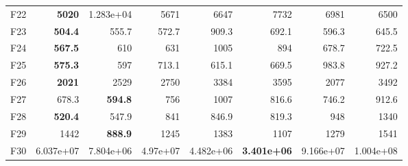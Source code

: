 \begin{tabular}{lrrrrrrr}
F22 & \textbf{5020} & 1.283e+04 & 5671 & 6647 & 7732 & 6981 & 6500 \\
F23 & \textbf{504.4} & 555.7 & 572.7 & 909.3 & 692.1 & 596.3 & 645.5 \\
F24 & \textbf{567.5} & 610 & 631 & 1005 & 894 & 678.7 & 722.5 \\
F25 & \textbf{575.3} & 597 & 713.1 & 615.1 & 669.5 & 983.8 & 927.2 \\
F26 & \textbf{2021} & 2529 & 2750 & 3384 & 3595 & 2077 & 3492 \\
F27 & 678.3 & \textbf{594.8} & 756 & 1007 & 816.6 & 746.2 & 912.6 \\
F28 & \textbf{520.4} & 547.9 & 841 & 846.9 & 819.3 & 948 & 1340 \\
F29 & 1442 & \textbf{888.9} & 1245 & 1383 & 1107 & 1279 & 1541 \\
F30 & 6.037e+07 & 7.804e+06 & 4.97e+07 & 4.482e+06 & \textbf{3.401e+06} & 9.166e+07 & 1.004e+08 \\
\bottomrule
\end{tabular}
